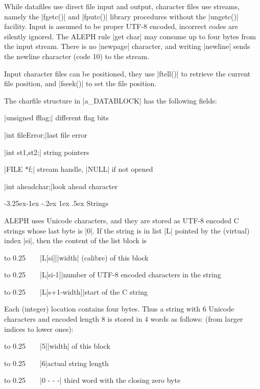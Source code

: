 \documentclass{article}
\makeatletter
\newcommand\A{{\sf ALEPH}}
\renewcommand\subsection{%
\@startsection{subsection}{2}{\z@}%
   {-3.25ex\@plus -1ex \@minus -.2ex}%
   {1ex \@plus .5ex}%
   {\normalfont\normalsize\bfseries}}
\makeatother
\begin{document}
While datafiles use direct file input and output, character files use
streams, namely the \pp|fgetc()| and \pp|fputc()| library procedures without the
\pp|ungetc()| facility. Input is assumed to be proper UTF-8 encoded, incorrect codes are
silently ignored. The \A{} rule \pp|get char| may consume
up to four bytes from the input stream. There is no \pp|newpage| character,
and writing \pp|newline| sends the newline character (code 10) to the
stream.

Input character files can be positioned, they use \pp|ftell()| to retrieve
the current file position, and \pp|fseek()| to set the file position.

The charfile structure in \pp|a\_DATABLOCK| has the following fields:
\medskip

\HH\pp|unsigned fflag;| \HE different flag bits

\HH\pp|int      fileError;|\HE last file error

\HH\pp|int      st1,st2;| \HE string pointers

\HH\pp|FILE     *f;|      \HE stream handle, \pp|NULL| if not opened

\HH\pp|int      aheadchar;|\HE look ahead character


\subsection{Strings}

\A{} uses Unicode characters, and they are stored as UTF-8 encoded {\sf C}
strings whose last byte is \pp|{}0|.  If the string is in list \pp|L|
pointed by the (virtual) index \pp|si|, then the content of the list block
is

\def\HH{\noindent\hbox to 0.25\linewidth\bgroup~~~~}%
\smallskip

\HH\pp|L[si]|\HE \pp|width| (calibre) of this block

\HH\pp|L[si-1]|\HE number of UTF-8 encoded characters in the string

\HH\pp|L[s+1-width]|\HE start of the {\sf C} string

\smallskip
\noindent
Each (integer) location contains four bytes. Thus a string with 6 Unicode characters
and encoded length 8 is stored in 4 words as follows: (from larger indices to lower
ones):
\smallskip

\HH\pp|5|\HE  \pp|width| of this block

\HH\pp|6|\HE   actual string length

\HH\pp|{}0  -  -  -| \HE third word with the closing zero byte
\end{document}
